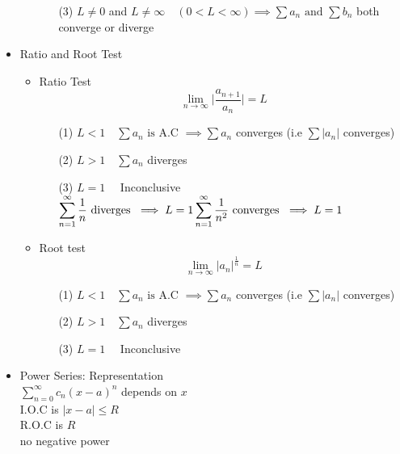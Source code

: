 \begin{itemize}
\begin{itemize}
\begin{itemize}
\item[(3)] \(L \neq 0\) and \(L \neq \infty \quad (0 < L < \infty) \implies \displaystyle \sum a_n \text{ and } \sum b_n\) both converge or diverge
\end{itemize}
\end{itemize}
\item Ratio and Root Test
\begin{itemize}
\item Ratio Test\\
\[\displaystyle \lim_{n \to \infty} \Big| \frac{a_{n+1}}{a_n}\Big| = L\]
\begin{itemize}
\item[(1)] \(L < 1 \quad \displaystyle \sum a_n \text{ is A.C } \implies \sum a_n\) converges \quad (i.e \(\displaystyle \sum |a_n|\) converges)
\item[(2)] \(L > 1 \quad \displaystyle \sum a_n\) diverges
\item[(3)] \(L = 1 \quad\) Inconclusive\\
\(\displaystyle \sum^{\infty}_{n = 1} \frac{1}{n} \text{ diverges } \implies L = 1\\
\displaystyle \sum^{\infty}_{n = 1} \frac{1}{n^2} \text{ converges } \implies L = 1\)
\end{itemize}
\item Root test
\[\displaystyle \lim_{n \to \infty} |a_n|^{\frac{1}{n}} = L\]
\begin{itemize}
\item[(1)] \(L < 1 \quad \displaystyle \sum a_n \text{ is A.C } \implies \sum a_n\) converges \quad (i.e \(\displaystyle \sum |a_n|\) converges)
\item[(2)] \(L > 1 \quad \displaystyle \sum a_n\) diverges
\item[(3)] \(L = 1 \quad\) Inconclusive
\end{itemize}
\end{itemize}
\item Power Series: Representation\\
\(\displaystyle \sum^{\infty}_{n = 0} c_n (x - a)^n\) depends on \(x\)\\
I.O.C is \(|x -a| \leq R\)\\
R.O.C is \(R\)\\
no negative power 
\end{itemize}
